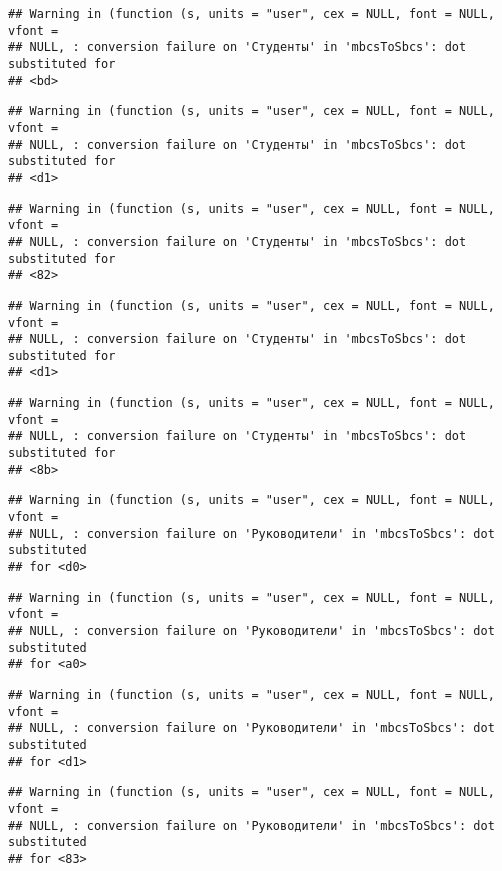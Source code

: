 \documentclass[
]{article}
\begin{document}
\begin{verbatim}
## Warning in (function (s, units = "user", cex = NULL, font = NULL, vfont =
## NULL, : conversion failure on 'Студенты' in 'mbcsToSbcs': dot substituted for
## <bd>
\end{verbatim}

\begin{verbatim}
## Warning in (function (s, units = "user", cex = NULL, font = NULL, vfont =
## NULL, : conversion failure on 'Студенты' in 'mbcsToSbcs': dot substituted for
## <d1>
\end{verbatim}

\begin{verbatim}
## Warning in (function (s, units = "user", cex = NULL, font = NULL, vfont =
## NULL, : conversion failure on 'Студенты' in 'mbcsToSbcs': dot substituted for
## <82>
\end{verbatim}

\begin{verbatim}
## Warning in (function (s, units = "user", cex = NULL, font = NULL, vfont =
## NULL, : conversion failure on 'Студенты' in 'mbcsToSbcs': dot substituted for
## <d1>
\end{verbatim}

\begin{verbatim}
## Warning in (function (s, units = "user", cex = NULL, font = NULL, vfont =
## NULL, : conversion failure on 'Студенты' in 'mbcsToSbcs': dot substituted for
## <8b>
\end{verbatim}

\begin{verbatim}
## Warning in (function (s, units = "user", cex = NULL, font = NULL, vfont =
## NULL, : conversion failure on 'Руководители' in 'mbcsToSbcs': dot substituted
## for <d0>
\end{verbatim}

\begin{verbatim}
## Warning in (function (s, units = "user", cex = NULL, font = NULL, vfont =
## NULL, : conversion failure on 'Руководители' in 'mbcsToSbcs': dot substituted
## for <a0>
\end{verbatim}

\begin{verbatim}
## Warning in (function (s, units = "user", cex = NULL, font = NULL, vfont =
## NULL, : conversion failure on 'Руководители' in 'mbcsToSbcs': dot substituted
## for <d1>
\end{verbatim}

\begin{verbatim}
## Warning in (function (s, units = "user", cex = NULL, font = NULL, vfont =
## NULL, : conversion failure on 'Руководители' in 'mbcsToSbcs': dot substituted
## for <83>
\end{verbatim}
\end{document}
